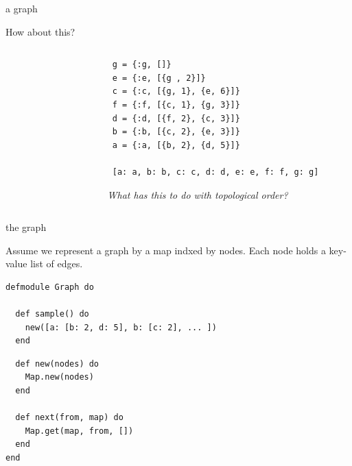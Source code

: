 \begin{frame}[fragile]{a graph}

How about this?

\begin{columns}
 \begin{column}{0.4\linewidth}
\begin{figure}
\end{figure}
 \end{column}
 \begin{column}{0.6\linewidth}
\begin{verbatim}
 g = {:g, []}
 e = {:e, [{g , 2}]}
 c = {:c, [{g, 1}, {e, 6}]}
 f = {:f, [{c, 1}, {g, 3}]}
 d = {:d, [{f, 2}, {c, 3}]}
 b = {:b, [{c, 2}, {e, 3}]}
 a = {:a, [{b, 2}, {d, 5}]}

 [a: a, b: b, c: c, d: d, e: e, f: f, g: g]
 \end{verbatim}
\pause
{\em What has this to do with topological order?}
\end{column}
\end{columns}

\end{frame}


\begin{frame}[fragile]{the graph}

  Assume we represent a graph by a map indxed by nodes. Each node holds a key-value list of edges.

\begin{verbatim}
defmodule Graph do

  def sample() do
    new([a: [b: 2, d: 5], b: [c: 2], ... ])
  end
\end{verbatim}

\begin{verbatim}
  def new(nodes) do
    Map.new(nodes)
  end

  def next(from, map) do
    Map.get(map, from, [])
  end
end
\end{verbatim}

\end{frame}

